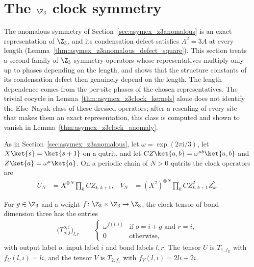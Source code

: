 
\section{The \texorpdfstring{$\Z_3$}{Z3} clock symmetry}%
\label{sec:asymex_z3clock}

The anomalous symmetry of Section~\ref{sec:asymex_z3anomalous} is an exact
representation of $\Z_3$, and its condensation defect satisfies
$A^2=3A$ at every length
(Lemma~\ref{thm:asymex_z3anomalous_defect_square}). This section
treats a second family of $\Z_3$ symmetry operators whose representatives
multiply only up to phases depending on the length, and shows that the
structure constants of its condensation defect then genuinely depend on the
length. The length dependence comes from the per-site phases of the chosen
representatives. The trivial cocycle in
Lemma~\ref{thm:asymex_z3clock_kernels} alone does not identify the
Else--Nayak class of these dressed operators; after a rescaling of every site
that makes them an exact representation, this class is computed and shown to
vanish in Lemma~\ref{thm:asymex_z3clock_anomaly}.

As in Section~\ref{sec:asymex_z3anomalous}, let
$\omega=\exp(2\pi\mathrm{i}/3)$, let $X\ket{s}=\ket{s+1}$ on a qutrit, and
let $CZ\ket{a,b}=\omega^{ab}\ket{a,b}$ and $Z\ket{a}=\omega^a\ket{a}$. On a
periodic chain of $N>0$ qutrits the clock operators are
\begin{align}
    U_N & =X^{\otimes N}\prod_{k}CZ_{k,k+1},                    &
    V_N & =(X^{2})^{\otimes N}\prod_{k}CZ^{2}_{k,k+1}Z^{2}_{k}.
\end{align}

\begin{definition}
    \label{def:asymex_z3clock_tensors}
    \leanok
    For $g\in\Z_3$ and a weight $f\colon\Z_3\times\Z_3\to\Z_3$, the clock
    tensor of bond dimension three has the entries
    \begin{align}
        \bigl(T_{g,f}^{o,i}\bigr)_{l,r} & =
        \begin{cases}
            \omega^{f(l,i)} & \text{if } o=i+g \text{ and } r=i, \\
            0               & \text{otherwise},
        \end{cases}
    \end{align}
    with output label $o$, input label $i$ and bond labels $l,r$. The
    tensor $U$ is $T_{1,f_U}$ with $f_U(l,i)=li$, and the tensor $V$ is
    $T_{2,f_V}$ with $f_V(l,i)=2li+2i$.
\end{definition}

